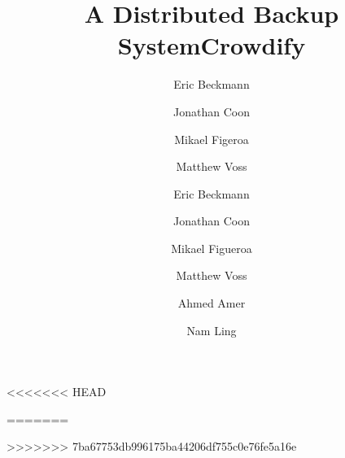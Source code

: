 \documentclass{scu-thesis}
\author{Eric Beckmann}
\author{Jonathan Coon}
\author{Mikael Figeroa}
\author{Matthew Voss}
\title{A Distributed Backup System}
\author{Eric Beckmann}
\author{Jonathan Coon}
\author{Mikael Figueroa}
\author{Matthew Voss}
\title{Crowdify}
\begin{document}
\frontmatter
\signature{Ahmed Amer}
\signature{Nam Ling}

\maketitle


\tableofcontents
\listoffigures

\mainmatter

<<<<<<< HEAD

=======






>>>>>>> 7ba67753db996175ba44206df755c0e76fe5a16e

\backmatter
\end{document}
